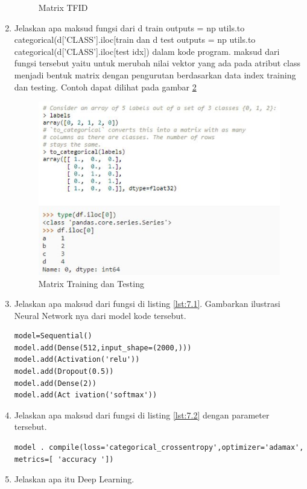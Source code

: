 \begin{enumerate}
\begin{figure}[!htbp]
	\caption{Matrix TFID}
	\label{c7_4}
\end{figure}
\item Jelaskan apa maksud fungsi dari d train outputs = np utils.to categorical(d['CLASS'].iloc[train dan d test outputs = np utils.to categorical(d['CLASS'].iloc[test idx]) dalam kode program.
\subitem maksud dari fungsi tersebut yaitu untuk merubah nilai vektor yang ada pada atribut class menjadi bentuk matrix dengan pengurutan berdasarkan data index training dan testing. Contoh dapat dilihat pada gambar \ref{c7_5}
\begin{figure}[!htbp]
	\centerline{\includegraphics[width=1\textwidth]{figures/huda/chapter7/5.JPG}}
	\caption{Matrix Training dan Testing}
	\label{c7_5}
\end{figure}
\item Jelaskan apa maksud dari fungsi di listing \ref{lst:7.1}. Gambarkan ilustrasi Neural Network nya dari model kode tersebut.
\begin{lstlisting}[caption=Neural Network,label={lst:7.1}]
model=Sequential()
model.add(Dense(512,input_shape=(2000,)))
model.add(Activation('relu'))
model.add(Dropout(0.5))
model.add(Dense(2))
model.add(Act ivation('softmax'))
\end{lstlisting}
\item Jelaskan apa maksud dari fungsi di listing \ref{lst:7.2} dengan parameter tersebut.
\begin{lstlisting}[caption=Model Compile Metric,label={lst:7.2}]
model . compile(loss='categorical_crossentropy',optimizer='adamax',
metrics=[ 'accuracy '])
\end{lstlisting}
\item Jelaskan apa itu Deep Learning.

\end{enumerate}
